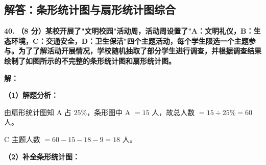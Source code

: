 \newpage

\newpage

\subsection{解答：条形统计图与扇形统计图综合}

\vspace{0.6cm}

\textbf{\LARGE 40.} \textbf{（8 分）某校开展了"文明校园"活动周，活动周设置了"A：文明礼仪，B：生态环境，C：交通安全，D：卫生保洁"四个主题活动，每个学生限选一个主题参与。为了了解活动开展情况，学校随机抽取了部分学生进行调查，并根据调查结果绘制了如图所示的不完整的条形统计图和扇形统计图。}

\vspace{0.4cm}
\textbf{解：}

\textbf{（1）解题分析：}

由扇形统计图知 A 占 $25\%$，条形图中 A $= 15$ 人，故总人数 $= 15 \div 25\% = 60$ 人。

C 主题人数 $= 60 - 15 - 18 - 9 = 18$ 人。

\vspace{0.2cm}
\textbf{（2）补全条形统计图：}

